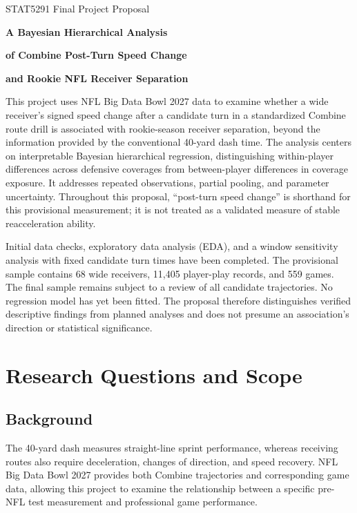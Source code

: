 \documentclass[a4paper,11pt]{article}
\begin{document}
\begin{center}
{\large STAT5291 Final Project Proposal\par}
\vspace{.6em}
{\LARGE\bfseries A Bayesian Hierarchical Analysis\par}
\vspace{.2em}
{\LARGE\bfseries of Combine Post-Turn Speed Change\par}
\vspace{.2em}
{\LARGE\bfseries and Rookie NFL Receiver Separation\par}
\end{center}
\vspace{.3em}

This project uses NFL Big Data Bowl 2027 data to examine whether a wide receiver's signed speed change after a candidate turn in a standardized Combine route drill is associated with rookie-season receiver separation, beyond the information provided by the conventional 40-yard dash time. The analysis centers on interpretable Bayesian hierarchical regression, distinguishing within-player differences across defensive coverages from between-player differences in coverage exposure. It addresses repeated observations, partial pooling, and parameter uncertainty. Throughout this proposal, ``post-turn speed change'' is shorthand for this provisional measurement; it is not treated as a validated measure of stable reacceleration ability.

Initial data checks, exploratory data analysis (EDA), and a window sensitivity analysis with fixed candidate turn times have been completed. The provisional sample contains 68 wide receivers, 11,405 player-play records, and 559 games. The final sample remains subject to a review of all candidate trajectories. No regression model has yet been fitted. The proposal therefore distinguishes verified descriptive findings from planned analyses and does not presume an association's direction or statistical significance.

\section{Research Questions and Scope}

\subsection{Background}

The 40-yard dash measures straight-line sprint performance, whereas receiving routes also require deceleration, changes of direction, and speed recovery. NFL Big Data Bowl 2027 provides both Combine trajectories and corresponding game data, allowing this project to examine the relationship between a specific pre-NFL test measurement and professional game performance.\cite{nfl}
\end{document}
